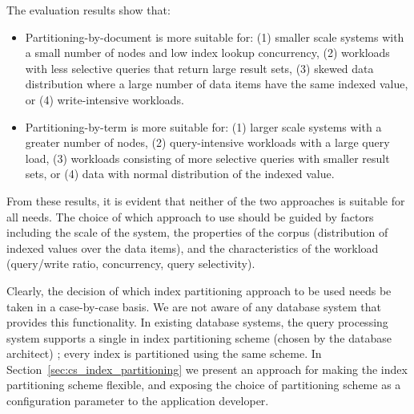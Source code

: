 



The evaluation results show that:
\begin{itemize}

  \item Partitioning-by-document is more suitable for:
  (1) smaller scale systems with a small number of nodes and low index lookup concurrency,
  (2) workloads with less selective queries that return large result sets,
  (3) skewed data distribution where a large number of data items have the same indexed value,
  or (4) write-intensive workloads.

  \item Partitioning-by-term is more suitable for:
  (1) larger scale systems with a greater number of nodes,
  (2) query-intensive workloads with a large query load,
  (3) workloads consisting of more selective queries with smaller result sets,
  or (4) data with normal distribution of the indexed value.

\end{itemize}

From these results, it is evident that neither of the two approaches is suitable for all needs.
The choice of which approach to use should be guided by factors including the scale of the system,
the properties of the corpus (distribution of indexed values over the data items),
and the characteristics of the workload (query/write ratio, concurrency, query selectivity).

Clearly, the decision of which index partitioning approach to be used needs be taken in a case-by-case basis.
We are not aware of any database system that provides this functionality.
In existing database systems,
the query processing system supports a single in index partitioning scheme (chosen by the database architect) \cite{kejriwal:slik, tan:diffindex, riakv:secondaryindexes, cassandra:secondaryindexing};
every index is partitioned using the same scheme.
In Section~\ref{sec:cs_index_partitioning} we present an approach for making the index partitioning scheme flexible,
and exposing the choice of partitioning scheme as a configuration parameter to the application developer.

